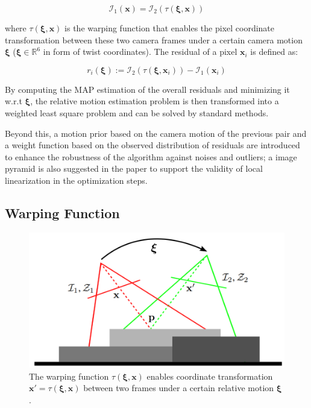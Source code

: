 \documentclass[acmsmall, nonacm, 11pt]{acmart}
\begin{document}
\begin{equation*}
\mathcal{I}_{1}(\mathbf{x}) = \mathcal{I}_{2}(\tau(\boldsymbol{\xi}, \mathbf{x}))
\end{equation*}

\noindent where $\tau(\boldsymbol{\xi}, \mathbf{x})$ is the warping function that enables the pixel coordinate transformation between these two camera frames under a certain camera motion $\boldsymbol{\xi}$ ($\boldsymbol{\xi} \in \mathbb{R}^6$ in form of twist coordinates). The residual of a pixel $\mathbf{x}_i$ is defined as:

\begin{equation}
r_i(\boldsymbol{\xi}) := \mathcal{I}_2\left(\tau\left(\boldsymbol{\xi}, \mathbf{x}_i\right)\right)-\mathcal{I}_1\left(\mathbf{x}_i\right)
\label{residual}
\end{equation}

By computing the MAP estimation of the overall residuals and minimizing it w.r.t $\boldsymbol{\xi}$, the relative motion estimation problem is then transformed into a weighted least square problem and can be solved by standard methods.

Beyond this, a motion prior based on the camera motion of the previous pair and a weight function based on the observed distribution of residuals are introduced to enhance the robustness of the algorithm against noises and outliers; a image pyramid is also suggested in the paper to support the validity of local linearization in the optimization steps.

\subsection{Warping Function}

\begin{figure}[h]
    \centering
    \includegraphics[width=0.6\linewidth]{imgs/warping.png}
    \caption{The warping function $\tau(\boldsymbol{\xi}, \mathbf{x})$ enables coordinate transformation $\mathbf{x}' = \tau(\boldsymbol{\xi}, \mathbf{x})$ between two frames under a certain relative motion $\boldsymbol{\xi}$ \cite{kerl2013robust}.}
    \label{warping}
\end{figure}
\end{document}
